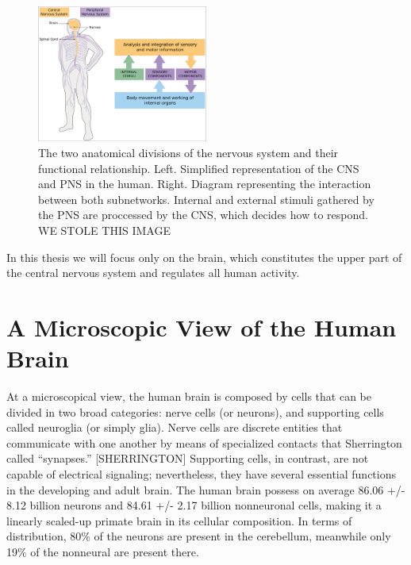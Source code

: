\begin{figure}[h!]                                                                                                                    
    \includegraphics[width=0.5\textwidth]{1.background/neuroanatomy/img/1.pns_and_cns.png}
    \caption{The two anatomical divisions of the nervous system and their functional relationship.
             Left. Simplified representation of the CNS and PNS in the human.
             Right. Diagram representing the interaction between both subnetworks. Internal and external stimuli gathered by the PNS are proccessed by the CNS, which decides how to respond.
             WE STOLE THIS IMAGE}
    \label{fig:cns_and_pns}
\end{figure}  


In this thesis we will focus only on the brain, which constitutes the upper part of the central nervous system and regulates all human activity.

\section{A Microscopic View of the Human Brain}
\cite{Waehnert2014}

At a microscopical view, the human brain is composed by cells that can be divided in two broad categories: nerve cells (or neurons), and supporting cells called neuroglia (or simply glia).
Nerve cells are discrete entities that communicate with one another by means of specialized contacts that Sherrington called “synapses.” [SHERRINGTON]
Supporting cells, in contrast, are not capable of electrical signaling; nevertheless, they have several essential functions in the developing and adult brain.
The human brain possess on average 86.06 +/- 8.12 billion neurons and 84.61 +/- 2.17 billion nonneuronal cells, making it a linearly scaled-up primate brain in its cellular composition.
In terms of distribution, 80\% of the neurons are present in the cerebellum, meanwhile only 19\% of the nonneural are present there.

